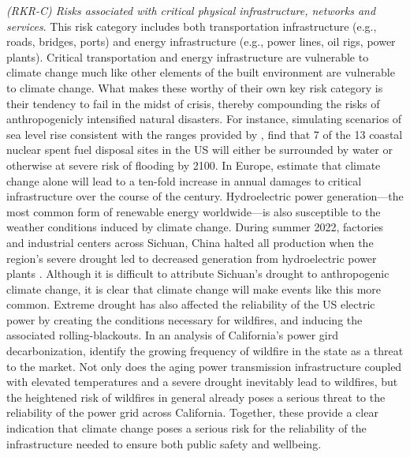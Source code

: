 \textit{(RKR-C) Risks associated with critical physical infrastructure, networks and services}. This risk category includes both transportation infrastructure (e.g., roads, bridges, ports) and energy infrastructure (e.g., power lines, oil rigs, power plants). Critical transportation and energy infrastructure are vulnerable to climate change much like other elements of the built environment are vulnerable to climate change. What makes these worthy of their own key risk category is their tendency to fail in the midst of crisis, thereby compounding the risks of anthropogenicly intensified natural disasters. 
For instance, simulating scenarios of sea level rise consistent with the ranges provided by \cite{sweet2022global}, \cite{jenkins2020unmanaged} find that 7 of the 13 coastal nuclear spent fuel disposal sites in the US will either be surrounded by water or otherwise at severe risk of flooding by 2100. In Europe, \cite{forzieri2018escalating} estimate that climate change alone will lead to a ten-fold increase in annual damages to critical infrastructure over the course of the century. Hydroelectric power generation---the most common form of renewable energy worldwide---is also susceptible to the weather conditions induced by climate change. During summer 2022, factories and industrial centers across Sichuan, China halted all production when the region's severe drought led to decreased generation from hydroelectric power plants \citep{davidson2022china}. Although it is difficult to attribute Sichuan's drought to anthropogenic climate change, it is clear that climate change will make events like this more common. Extreme drought has also affected the reliability of the US electric power by creating the conditions necessary for wildfires, and inducing the associated rolling-blackouts. In an analysis of California's power gird decarbonization, \cite{borenstein2021designing} identify the growing frequency of wildfire in the state as a threat to the market. Not only does the aging power transmission infrastructure coupled with elevated temperatures and a severe drought inevitably lead to wildfires, but the heightened risk of wildfires in general already poses a serious threat to the reliability of the power grid across California. Together, these provide a clear indication that climate change poses a serious risk for the reliability of the infrastructure needed to ensure both public safety and wellbeing.

